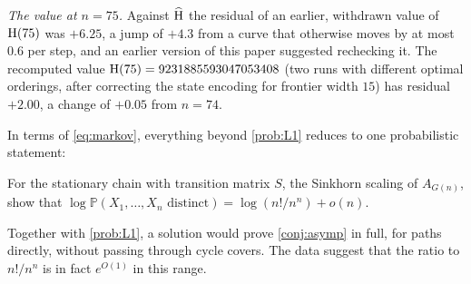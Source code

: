 \emph{The value at $n=75$.} Against $\widehat{\mathrm{H}}$ the residual of an earlier, withdrawn value of
$\mathrm{H}(75)$ was $+6.25$, a jump of $+4.3$ from a curve that otherwise moves by at most $0.6$ per
step, and an earlier version of this paper suggested rechecking it. The recomputed value
$\mathrm{H}(75)=9231885593047053408$ (two runs with different optimal orderings, after correcting the
state encoding for frontier width $15$) has residual $+2.00$, a change of $+0.05$ from $n=74$.

In terms of \eqref{eq:markov}, everything beyond \cref{prob:L1} reduces to one probabilistic
statement:
\begin{problem}[L$^*$]\label{prob:Lstar}
For the stationary chain with transition matrix $S$, the Sinkhorn scaling of $A_{G(n)}$, show that
$\log\mathbb{P}(X_1,\dots,X_n\text{ distinct})=\log(n!/n^n)+o(n)$.
\end{problem}
Together with \cref{prob:L1}, a solution would prove \cref{conj:asymp} in full, for paths
directly, without passing through cycle covers. The data suggest that the ratio to $n!/n^n$ is
in fact $e^{O(1)}$ in this range.
